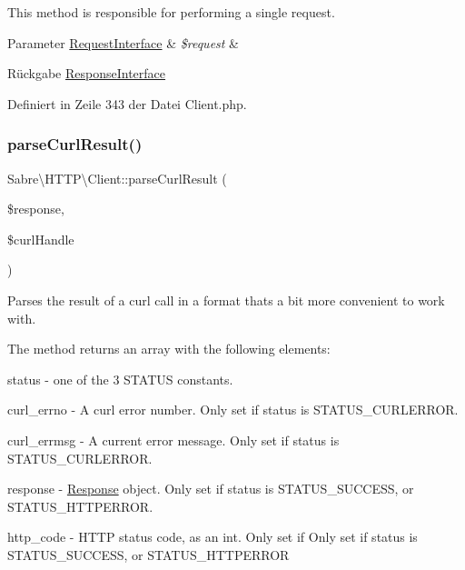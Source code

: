This method is responsible for performing a single request.


\begin{DoxyParams}[1]{Parameter}
\mbox{\hyperlink{interface_sabre_1_1_h_t_t_p_1_1_request_interface}{Request\+Interface}} & {\em \$request} & \\
\hline
\end{DoxyParams}
\begin{DoxyReturn}{Rückgabe}
\mbox{\hyperlink{interface_sabre_1_1_h_t_t_p_1_1_response_interface}{Response\+Interface}} 
\end{DoxyReturn}


Definiert in Zeile 343 der Datei Client.\+php.

\mbox{\label{class_sabre_1_1_h_t_t_p_1_1_client_a05ab65c44b05372c582637604a19a617}} 
\subsubsection{\texorpdfstring{parse\+Curl\+Result()}{parseCurlResult()}}
{\footnotesize\ttfamily Sabre\textbackslash{}\+H\+T\+T\+P\textbackslash{}\+Client\+::parse\+Curl\+Result (\begin{DoxyParamCaption}\item[{}]{\$response,  }\item[{}]{\$curl\+Handle }\end{DoxyParamCaption})\hspace{0.3cm}{\ttfamily [protected]}}

Parses the result of a curl call in a format that\textquotesingle{}s a bit more convenient to work with.

The method returns an array with the following elements\+:
\begin{DoxyItemize}
\item status -\/ one of the 3 S\+T\+A\+T\+US constants.
\item curl\+\_\+errno -\/ A curl error number. Only set if status is S\+T\+A\+T\+U\+S\+\_\+\+C\+U\+R\+L\+E\+R\+R\+OR.
\item curl\+\_\+errmsg -\/ A current error message. Only set if status is S\+T\+A\+T\+U\+S\+\_\+\+C\+U\+R\+L\+E\+R\+R\+OR.
\item response -\/ \mbox{\hyperlink{class_sabre_1_1_h_t_t_p_1_1_response}{Response}} object. Only set if status is S\+T\+A\+T\+U\+S\+\_\+\+S\+U\+C\+C\+E\+SS, or S\+T\+A\+T\+U\+S\+\_\+\+H\+T\+T\+P\+E\+R\+R\+OR.
\item http\+\_\+code -\/ H\+T\+TP status code, as an int. Only set if Only set if status is S\+T\+A\+T\+U\+S\+\_\+\+S\+U\+C\+C\+E\+SS, or S\+T\+A\+T\+U\+S\+\_\+\+H\+T\+T\+P\+E\+R\+R\+OR
\end{DoxyItemize}


